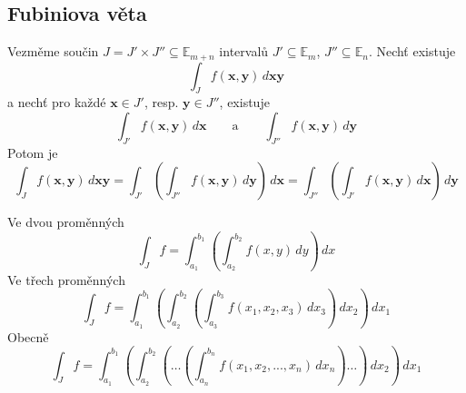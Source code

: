 \documentclass[../main.tex]{subfiles}
\begin{document}
\subsection{Fubiniova věta}
\begin{theorem}
	Vezměme součin $J = J' \times J'' \subseteq \mathbb{E}_{m+n}$ intervalů $J' \subseteq \mathbb{E}_m$,
	$J'' \subseteq \mathbb{E}_n$. Nechť existuje
	\[ \int_{J} f(\mathbf{x}, \mathbf{y}) \,d\mathbf{xy} \]
	a nechť pro každé $\mathbf{x} \in J'$, resp. $\mathbf{y} \in J''$, existuje
	\[ \int_{J'} f(\mathbf{x}, \mathbf{y}) \,d\mathbf{x} \qquad \text{a} \qquad \int_{J''} f(\mathbf{x}, \mathbf{y}) \,d\mathbf{y} \]
	Potom je
	\[ \int_J f(\mathbf{x}, \mathbf{y}) \,d\mathbf{xy} =
	\int_{J'} \left( \int_{J''} f(\mathbf{x}, \mathbf{y}) \,d\mathbf{y} \right) \,d\mathbf{x} = 
	\int_{J''} \left( \int_{J'} f(\mathbf{x}, \mathbf{y}) \,d\mathbf{x} \right) \,d\mathbf{y}\]
\end{theorem}

\begin{example}
	Ve dvou proměnných
	\[ \int_{J} f = \int_{a_1}^{b_1} \left( \int_{a_2}^{b_2} f(x,y) \,dy \right) \,dx \]
	Ve třech proměnných
	\[ \int_{J} f =
	\int_{a_1}^{b_1} \left(
	\int_{a_2}^{b_2} \left(
	\int_{a_3}^{b_3} f(x_1, x_2, x_3) \,dx_3 \right) \,dx_2 \right) \,dx_1 \]
	Obecně
	\[ \int_{J} f =
	\int_{a_1}^{b_1} \left(
	\int_{a_2}^{b_2} \left(
	\dots \left(
	\int_{a_n}^{b_n} f(x_1, x_2, ..., x_n) \,dx_n \right) \dots \right) \,dx_2 \right) \,dx_1 \]
\end{example}
\end{document}
